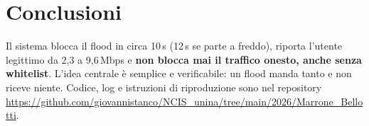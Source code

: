 \documentclass[11pt,a4paper]{article}
\begin{document}
\section{Conclusioni}
Il sistema blocca il flood in circa 10\,s (12\,s se parte a freddo), riporta l'utente legittimo da
2,3 a 9,6\,Mbps e \textbf{non blocca mai il traffico onesto, anche senza whitelist}. L'idea
centrale \`e semplice e verificabile: un flood manda tanto e non riceve niente. Codice, log e
istruzioni di riproduzione sono nel repository
\url{https://github.com/giovannistanco/NCIS_unina/tree/main/2026/Marrone_Bellotti}.
\end{document}
